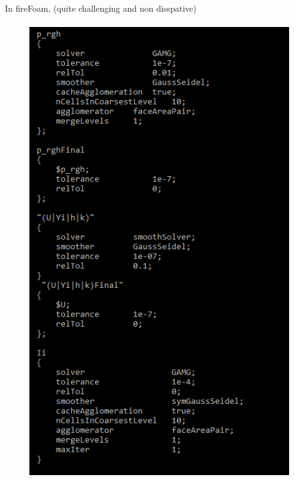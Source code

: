 \documentclass[12pt]{article}
\renewcommand{\_}{\kern-1.5pt\textunderscore\kern-1.5pt}
\begin{document}

\par

In fireFoam, (quite challenging and non disspative)\par




\begin{figure}[H]
	\begin{Center}
		\includegraphics[width=4.49in,height=7.73in]{./media/image11.png}
	\end{Center}
\end{figure}


\end{document}
